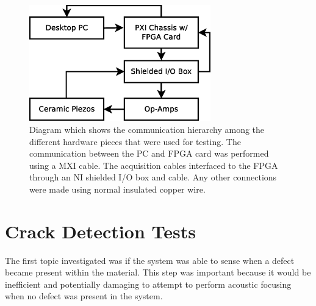 \begin{figure}[ht!]
\centering
\includegraphics[width=0.7\textwidth]{eps_pics/hardwareComm}
\caption{Diagram which shows the communication hierarchy among the different hardware pieces that were used for testing. The communication between the PC and FPGA card was performed using a MXI cable. The acquisition cables interfaced to the FPGA through an NI shielded I/O box and cable. Any other connections were made using normal insulated copper wire.
	 \label{fig:hardwareComm}} 
\end{figure}

\section{Crack Detection Tests}

The first topic investigated was if the system was able to sense when a defect became present within the material. This step was important because it would be inefficient and potentially damaging to attempt to perform acoustic focusing when no defect was present in the system.

